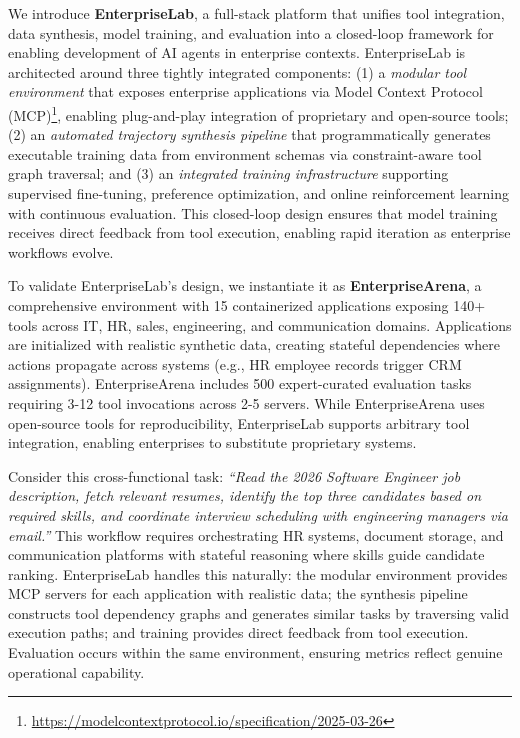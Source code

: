 \documentclass{article}
\theoremstyle{plain}
\theoremstyle{definition}
\theoremstyle{remark}
\begin{document}
We introduce \textbf{EnterpriseLab}, a full-stack platform that unifies tool integration, data synthesis, model training, and evaluation into a closed-loop framework for enabling development of AI agents in enterprise contexts. EnterpriseLab is architected around three tightly integrated components: (1) a \textit{modular tool environment} that exposes enterprise applications via Model Context Protocol (MCP)\footnote{\url{https://modelcontextprotocol.io/specification/2025-03-26}}, enabling plug-and-play integration of proprietary and open-source tools; (2) an \textit{automated trajectory synthesis pipeline} that programmatically generates executable training data from environment schemas via constraint-aware tool graph traversal; and (3) an \textit{integrated training infrastructure} supporting supervised fine-tuning, preference optimization, and online reinforcement learning with continuous evaluation. This closed-loop design ensures that model training receives direct feedback from tool execution, enabling rapid iteration as enterprise workflows evolve.

To validate EnterpriseLab's design, we instantiate it as \textbf{EnterpriseArena},  a comprehensive environment with 15 containerized applications exposing 140+ tools across IT, HR, sales, engineering, and communication domains. Applications  are initialized with realistic synthetic data, creating stateful dependencies where actions propagate across systems (e.g., HR employee records trigger CRM assignments). EnterpriseArena includes 500 expert-curated evaluation tasks requiring 3-12 tool invocations across 2-5 servers. While EnterpriseArena uses  open-source tools for reproducibility, EnterpriseLab supports arbitrary tool integration, enabling enterprises to substitute proprietary systems.

Consider this cross-functional task: \textit{``Read the 2026 Software Engineer job description, fetch relevant resumes, identify the top three candidates based on required skills, and coordinate interview scheduling with engineering managers via email.''} This workflow requires orchestrating HR systems, document storage, and communication platforms with stateful reasoning where skills guide candidate ranking. EnterpriseLab handles this naturally: the modular environment provides MCP servers for each application with realistic data; the synthesis pipeline constructs tool dependency graphs and  generates similar tasks by traversing valid execution paths; and training provides  direct feedback from tool execution. Evaluation occurs within the same environment, ensuring metrics reflect genuine operational capability.
\end{document}
